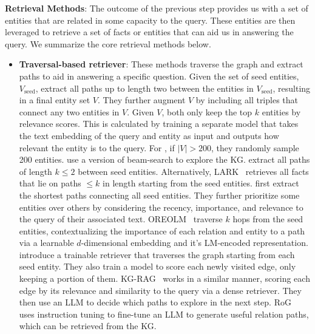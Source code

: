 {\bf Retrieval Methods}: The outcome of the previous step provides us with a set of entities that are related in some capacity to the query. These entities are then leveraged to retrieve a set of facts or entities that can aid us in answering the query. We summarize the core retrieval methods below.
\begin{itemize}[leftmargin=*]
    \item {\bf Traversal-based retriever}: These methods traverse the graph and extract paths to aid in answering a specific question. Given the set of seed entities, $V_{\text{seed}}$, \citet{yasunaga2021qa, yasunaga2022deep, zhanggreaselm} extract all paths up to length two between the entities in $V_{\text{seed}}$, resulting in a final entity set $V$. They further augment $V$ by including all triples that connect any two entities in $V$. Given $V$, both \cite{yasunaga2021qa, zhanggreaselm} only keep the top $k$ entities by relevance scores. This is calculated by training a separate model that takes the text embedding of the query and entity as input and outputs how relevant the entity is to the query. For \citet{yasunaga2022deep}, if $\lvert V \rvert > 200$, they randomly sample 200 entities. \citet{sunthink} use a version of beam-search to explore the KG. \citet{jiang2024hykge, feng2020scalable} extract all paths of length $k \leq 2$ between seed entities. Alternatively, LARK~\cite{choudhary2023complex} retrieves all facts that lie on paths $\leq k$ in length starting from the seed entities.     \citet{delile2024graph} first extract the shortest paths connecting all seed entities. They further prioritize some entities over others by considering the recency, importance, and relevance to the query of their associated text. OREOLM~\cite{hu2022empowering} traverse $k$ hops from the seed entities, contextualizing the importance of each relation and entity to a path via a learnable $d$-dimensional embedding and it's LM-encoded representation. \citet{zhang2022subgraph} introduce a trainable retriever that traverses the graph starting from each seed entity. They also train a model to score each newly visited edge, only keeping a portion of them. KG-RAG~\cite{sanmartin2024kg} works in a similar manner, scoring each edge by its relevance and similarity to the query via a dense retriever. They then use an LLM to decide which paths to explore in the next step.
    RoG~\cite{luoreasoning} uses instruction tuning to fine-tune an LLM to generate useful relation paths, which can be retrieved from the KG. 

\end{itemize}
